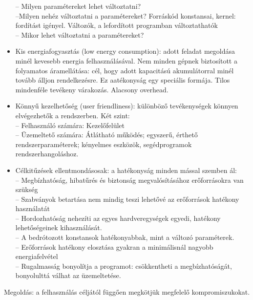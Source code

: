 \documentclass[fleqn,10pt,a4paper]{article}
\theoremstyle{magyar}
\begin{document}
\begin{itemize}
    -- Milyen paramétereket lehet változtatni?\\
    --Milyen nehéz változtatni  a paramétereket?  Forráskód konstansai, kernel: fordítást igényel. Változók, a
    lefordított programban változtathatók\\
    -- Mikor lehet változtatni a paramétereket?
  \item Kis energiafogyasztás (low energy consumption): adott feladat megoldása minél kevesebb energia
    felhasználásával. Nem minden gépnek biztosított a folyamatos áramellátása: cél, hogy adott kapacitású akumulátorral
    minél tovább álljon rendelkezésre. Ez aatékonyság egy speciális formája. Tilos mindenféle tevékeny várakozás. Alacsony
    overhead.
    
  \item  Könnyű kezelhetőség (user friendliness): különböző tevékenységek könnyen elvégezhetők a rendszerben. Két szint:\\
    -- Felhasználó számára: Kezelőfelület\\
    --  Üzemeltető számára: Átlátható működés; egyszerű, érthető rendszerparaméterek; kényelmes eszközök, segédprogramok
    rendszerhangoláshoz.
  \item Célkitűzések ellentmondásosak: a hatékonyság minden mással szemben ál:\\
    -- Megbízhatóság, hibatűrés és biztonság megvalósításához erőforrásokra van szükség\\
    -- Szabványok betartása nem mindig teszi lehetővé az erőforrások hatékony használatát\\ 
    -- Hordozhatóság nehezíti az egyes hardveregységek egyedi, hatékony lehetőségeinek kihasználását.\\
    -- A bedrótozott konstansok hatékonyabbak, mint a változó paraméterek.\\
    -- Erőforrások hatékony elosztása gyakran a minimálisnál nagyobb energiafelvétel\\
    -- Rugalmasság bonyolítja a programot: csökkentheti a megbízhatóságát, bonyolulttá válhat az üzemeltetése.
    
  \end{itemize}

  Megoldás: a felhasználás céljától függően megkötjük megfelelő kompromiszukokat.
  
\end{document}
